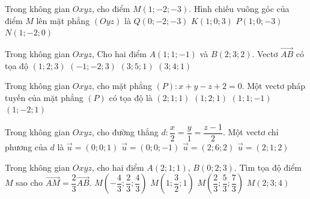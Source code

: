 \begin{ex}%
	Trong không gian $ Oxyz  $, cho điểm $ M(1;-2;-3) $. Hình chiếu vuông góc của điểm $ M $ lên mặt phẳng $ (Oyz) $ là
	\choice
	{\True $ Q(0;-2;-3) $}
	{$ K(1;0;3) $}
	{$ P(1;0;-3) $}
	{$ N(1;-2;0) $}
\end{ex}

\begin{ex}%
	Trong không gian $Oxyz$, Cho hai điểm $A(1;1;-1)$ và $B(2;3;2)$. Vectơ $\vec{AB}$ có tọa độ
	\choice
	{\True $(1;2;3)$}
	{$(-1;-2;3)$}
	{$(3;5;1)$}
	{$(3;4;1)$}
\end{ex}


\begin{ex}%
	Trong không gian $Oxyz$, cho mặt phẳng $(P)\colon x+y-z+2=0$. Một vectơ pháp tuyến của mặt phẳng $(P)$ có tọa độ là
	\choice
	{$(2;1;1)$}
	{$(1;2;1)$}
	{\True $(1;1;-1)$}
	{$(1;-2;1)$}
\end{ex}


\begin{ex}%
	Trong không gian $Oxyz$, cho đường thẳng $d\colon \dfrac{x}{2}=\dfrac{y}{1}=\dfrac{z-1}{2}$. Một vectơ chỉ phương của $d$ là
	\choice
	{$\vec{u}=(0;0;1)$}
	{$\vec{u}=(0;0;-1)$}
	{$\vec{u}=(2;6;2)$}
	{\True $\vec{u}=(2;1;2)$}
\end{ex}


\begin{ex}%
	Trong không gian $Oxyz$, cho hai điểm $A(2;1;1)$, $B(0;2;3)$. Tìm tọa độ điểm $M$ sao cho $\overrightarrow{AM}=\dfrac{2}{3}\overrightarrow{AB}$.
	\choice
	{$M\left(-\dfrac{4}{3};\dfrac{2}{3};\dfrac{4}{3}\right)$}
	{$M\left(1;\dfrac{3}{2};1\right)$}
	{\True $M\left(\dfrac{2}{3};\dfrac{5}{3};\dfrac{7}{3}\right)$}
	{$M\left(2;3;4\right)$}
\end{ex}


